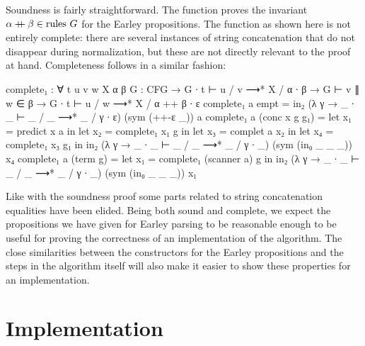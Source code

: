 		Soundness is fairly straightforward. The  function proves
		the invariant $\alpha \mathbin{{+}\mspace{-8mu}{+}} \beta \in \textrm{rules } G$ for the
		Earley propositions. The function as shown here is not entirely
		complete: there are several instances of string concatenation that do
		not disappear during normalization, but these are not directly relevant
		to the proof at hand. Completeness follows in a similar fashion:

		\begin{code}
			complete₁ : ∀ {t u v w X α β} {G : CFG} →
			  G ∙ t ⊢ u / v ⟶* X / α ∙ β →
			    G ⊢ v ∥ w ∈ β →
			  G ∙ t ⊢ u / w ⟶* X / α ++ β ∙ ε
			complete₁ a empt = in₂ (λ γ → _ ∙ _ ⊢ _ / _ ⟶* _ / γ ∙ ε) (sym (++-ε _)) a
			complete₁ a (conc x g g₁) =
			  let x₁ = predict x a in
			  let x₂ = complete₁ x₁ g in
			  let x₃ = complet a x₂ in
			  let x₄ = complete₁ x₃ g₁ in
			  in₂ (λ γ → _ ∙ _ ⊢ _ / _ ⟶* _ / γ ∙ _) (sym (in₀ _ _ _)) x₄
			complete₁ a (term g) =
			  let x₁ = complete₁ (scanner a) g in
			  in₂ (λ γ → _ ∙ _ ⊢ _ / _ ⟶* _ / γ ∙ _) (sym (in₀ _ _ _)) x₁
		\end{code}

		Like with the soundness proof some parts related to string
		concatenation equalities have been elided. Being both sound and
		complete, we expect the propositions we have given for Earley parsing
		to be reasonable enough to be useful for proving the correctness of an
		implementation of the algorithm. The close similarities between the
		constructors for the Earley propositions and the steps in the algorithm
		itself will also make it easier to show these properties for an
		implementation.

	\section{Implementation}

